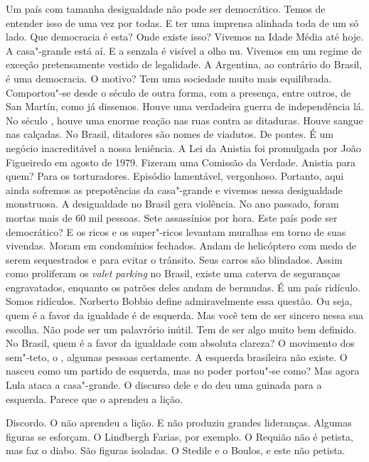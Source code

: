 \normalfont 
Um país com tamanha desigualdade não pode ser
democrático. Temos de entender isso de uma vez por todas. E ter uma
imprensa alinhada toda de um só lado. Que democracia é esta? Onde existe
isso? Vivemos na Idade Média até hoje. A casa"-grande está aí. E a
senzala é visível a olho nu. Vivemos em um regime de exceção
pretensamente vestido de legalidade. A Argentina, ao contrário do
Brasil, é uma democracia. O motivo? Tem uma sociedade muito mais
equilibrada. Comportou"-se desde o século  de outra forma, com a
presença, entre outros, de San Martín, como já dissemos. Houve uma
verdadeira guerra de independência lá. No século , houve uma enorme
reação nas ruas contra as ditaduras. Houve sangue nas calçadas. No
Brasil, ditadores são nomes de viadutos. De pontes. É um negócio
inacreditável a nossa leniência. A Lei da Anistia foi promulgada por
João Figueiredo em agosto de 1979. Fizeram uma Comissão da Verdade.
Anistia para quem? Para os torturadores. Episódio lamentável,
vergonhoso. Portanto, aqui ainda sofremos as prepotências da casa"-grande
e vivemos nessa desigualdade monstruosa. A desigualdade no Brasil gera
violência. No ano passado, foram mortas mais de 60 mil pessoas. Sete
assassínios por hora. Este país pode ser democrático? E os ricos e os
super"-ricos levantam muralhas em torno de suas vivendas. Moram em
condomínios fechados. Andam de helicóptero com medo de serem
sequestrados e para evitar o trânsito. Seus carros são blindados. Assim
como proliferam os \emph{valet parking} no Brasil, existe uma caterva de
seguranças engravatados, enquanto os patrões deles andam de bermudas. É
um país ridículo. Somos ridículos. Norberto Bobbio define admiravelmente
essa questão. Ou seja, quem é a favor da igualdade é de esquerda. Mas
você tem de ser sincero nessa sua escolha. Não pode ser um palavrório
inútil. Tem de ser algo muito bem definido. No Brasil, quem é a favor da
igualdade com absoluta clareza? O movimento dos sem"-teto, o , algumas
pessoas certamente. A esquerda brasileira não existe. O  nasceu como
um partido de esquerda, mas no poder portou"-se como?
%
 Mas agora Lula ataca a casa"-grande. O discurso dele e
do  deu uma guinada para a esquerda. Parece que o  aprendeu a lição.

\normalfont 
Discordo. O  não aprendeu a lição. E não produziu
grandes lideranças. Algumas figuras se esforçam. O Lindbergh Farias, por
exemplo. O Requião não é petista, mas faz o diabo. São figuras isoladas.
O Stedile e o Boulos, e este não petista.

